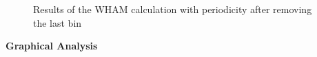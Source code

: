 \documentclass[a4paper,11pt]{scrartcl}
\begin{document}
\begin{figure} [htb]
	\caption{Results of the WHAM calculation with periodicity after removing the last bin}
	\label{fig:wham_180}
\end{figure}

\textbf{Graphical Analysis}
\end{document}

